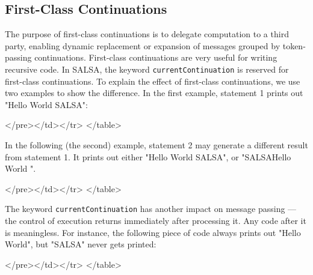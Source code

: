 \subsection{First-Class Continuations}
\label{First-Class Continuations}
The purpose of first-class continuations is to delegate 
computation to a third party, enabling dynamic replacement or 
expansion of messages grouped by token-passing continuations. 
First-class continuations are very useful for writing recursive 
code. In SALSA, the keyword {\tt currentContinuation} 
is reserved for first-class continuations. To explain the effect 
of first-class continuations, we use two examples to show the difference. In the first example, 
statement 1 prints out "Hello World SALSA":
{\singlespace

}
\begin{htmlonly}

 \begin{rawhtml} 
   </pre></td></tr>
  </table>
\end{rawhtml} 
\end{htmlonly} 

In the following (the second) example, statement 2 may generate 
a different result from statement 1. It prints out either 
"Hello World SALSA", or "SALSAHello World ". 
{\singlespace

}
\begin{htmlonly}

 \begin{rawhtml} 
   </pre></td></tr>
  </table>
\end{rawhtml} 
\end{htmlonly} 

The keyword {\tt currentContinuation} has another impact on 
message passing --- the control of execution returns immediately 
after processing it. Any code after it is meaningless. For 
instance, the following piece of code always prints out "Hello World", 
but "SALSA" never gets printed:
{\singlespace

}
\begin{htmlonly}

 \begin{rawhtml} 
   </pre></td></tr>
  </table>
\end{rawhtml} 
\end{htmlonly} 

